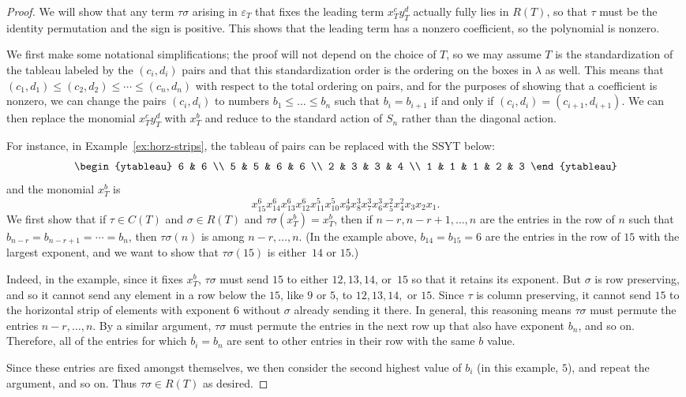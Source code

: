 \documentclass[ALCO,Unicode]{cedram}
\begin{document}
\begin{proof}
	We will show that any term $\tau\sigma$ arising in $\varepsilon_T$ that fixes the leading term $x_T^c y_T^d$ actually fully lies in $R(T)$, so that $\tau$ must be the identity permutation and the sign is positive.  This shows that the leading term has a nonzero coefficient, so the polynomial is nonzero.
	
	We first make some notational simplifications; the proof will not depend on the choice of $T$, so we may assume $T$ is the standardization of the tableau labeled by the $(c_i,d_i)$ pairs and that this standardization order is the ordering on the boxes in $\lambda$ as well.  This means that $(c_1,d_1)\le (c_2,d_2)\le \cdots \le (c_n,d_n)$ with respect to the total ordering on pairs, and for the purposes of showing that a coefficient is nonzero, we can change the pairs $(c_i,d_i)$ to numbers $b_1\le \ldots\le b_n$ such that $b_i=b_{i+1}$ if and only if $(c_i,d_i)=(c_{i+1},d_{i+1})$.  We can then replace the monomial $x_T^cy_T^d$ with $x_T^b$ and reduce to the standard action of $S_n$ rather than the diagonal action.  
	
	For instance, in Example~\ref{ex:horz-strips}, the tableau of pairs can be replaced with the SSYT below:
	$$\begin{ytableau}
	6 & 6 \\
	5 & 5 & 6 & 6 \\
	2 & 3 & 3 & 4 \\
	1 & 1 & 1 & 2 & 3 
	\end{ytableau}$$
	and the monomial $x_T^b$ is $$x_{15}^6x_{14}^6x_{13}^6x_{12}^6x_{11}^5x_{10}^5x_{9}^4x_{8}^3x_7^3x_6^3x_5^2x_4^2x_3x_2x_1.$$
	We first show that if $\tau\in C(T)$ and $\sigma \in R(T)$ and $\tau\sigma(x_T^b)=x_T^b$, then if $n-r,n-r+1,\ldots,n$ are the entries in the row of $n$ such that $b_{n-r}=b_{n-r+1}=\cdots = b_n$, then  $\tau\sigma(n)$ is among $n-r,\ldots,n$.  (In the example above, $b_{14}=b_{15}=6$ are the entries in the row of $15$ with the largest exponent, and we want to show that $\tau\sigma(15)$ is either~$14$ or $15$.) 
	
	Indeed, in the example, since it fixes $x_T^b$, $\tau\sigma$ must send $15$ to either $12, 13, 14$, or~$15$ so that it retains its exponent.  But $\sigma$ is row preserving, and so it cannot send any element in a row below  the $15$, like $9$ or $5$, to $12, 13, 14,$ or $15$.  Since $\tau$ is column preserving, it cannot send $15$ to the horizontal strip of elements with exponent $6$ without $\sigma$ already sending it there.  In general, this reasoning means $\tau \sigma$ must permute the entries $n-r,\ldots,n$.
	By a similar argument, $\tau\sigma$ must permute the entries in the next row up that also have exponent $b_n$, and so on.  Therefore, all of the entries for which $b_i=b_n$ are sent to other entries in their row with the same $b$ value. 
	
	Since these entries are fixed amongst themselves, we then consider the second highest value of $b_i$ (in this example, $5$), and repeat the argument, and so on.  Thus $\tau\sigma\in R(T)$ as desired.
\end{proof}
\end{document}
